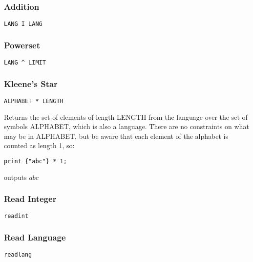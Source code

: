 \subsubsection{Addition}
\begin{verbatim}
LANG I LANG
\end{verbatim}
\begin{normalsize}

\end{normalsize}

\subsubsection{Powerset}
\begin{verbatim}
LANG ^ LIMIT
\end{verbatim}
\begin{normalsize}

\end{normalsize}

\subsubsection{Kleene's Star}
\begin{verbatim}
ALPHABET * LENGTH
\end{verbatim}
\begin{normalsize}
Returns the set of elements of length LENGTH from the language over the set of symbols ALPHABET, which is also a language. There are no constraints on what may be in ALPHABET, but be aware that each element of the alphabet is counted as length 1, so:
\begin{verbatim}
print {"abc"} * 1;
\end{verbatim}
outputs $ abc $
\end{normalsize}

\subsubsection{Read Integer}
\begin{verbatim}
readint
\end{verbatim}
\begin{normalsize}

\end{normalsize}

\subsubsection{Read Language}
\begin{verbatim}
readlang
\end{verbatim}
\begin{normalsize}

\end{normalsize}

